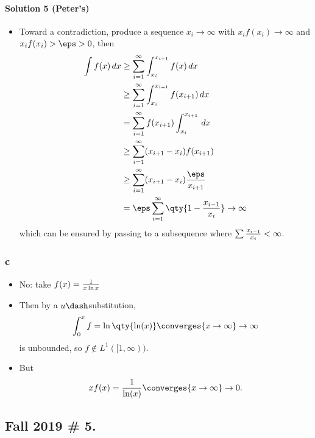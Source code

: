 \begin{solution}
\hypertarget{solution-5-peters}{%
\paragraph{Solution 5 (Peter's)}\label{solution-5-peters}}

\begin{itemize}
\tightlist
\item
  Toward a contradiction, produce a sequence \(x_i\to\infty\) with
  \(x_i f(x_i) \to \infty\) and \(x_if(x_i) > \eps > 0\), then
  \begin{align*}
  \int f(x) \, dx 
  &\geq \sum_{i=1}^\infty \int_{x_i}^{x_{i+1}} f(x) \, dx \\
  &\geq \sum_{i=1}^\infty \int_{x_i}^{x_{i+1}} f(x_{i+1}) \, dx \\
  &=    \sum_{i=1}^\infty f(x_{i+1}) \int_{x_i}^{x_{i+1}} \, dx \\
  &\geq \sum_{i=1}^\infty (x_{i+1} - x_i) f(x_{i+1}) \\
  &\geq \sum_{i=1}^\infty (x_{i+1} - x_i) {\eps \over x_{i+1}} \\
  &= \eps \sum_{i=1}^\infty \qty{ 1 - {x_{i-1} \over x_i}} \to \infty
  \end{align*} which can be ensured by passing to a subsequence where
  \(\sum {x_{i-1} \over x_i} < \infty\).
\end{itemize}

\hypertarget{c-1}{%
\subsubsection{c}\label{c-1}}

\begin{itemize}
\tightlist
\item
  No: take \(f(x) = {1\over x\ln x}\)
\item
  Then by a \(u\dash\)substitution, \begin{align*}
  \int_0^x f = \ln\qty{\ln (x)} \converges{x\to\infty}\to \infty
  \end{align*} is unbounded, so \(f\not\in L^1([1, \infty))\).
\item
  But \begin{align*}
  xf(x) = { 1 \over \ln(x)} \converges{x\to\infty} \to 0
  .\end{align*}
\end{itemize}

\end{solution}

\hypertarget{fall-2019-5.}{%
\subsection{Fall 2019 \# 5.}\label{fall-2019-5.}}

